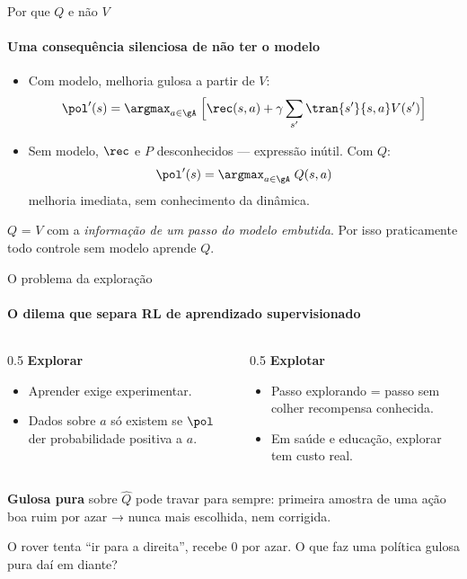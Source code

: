 \documentclass[aspectratio=169, 11pt]{beamer}
\newcommand{\Qhat}{\widehat{Q}}
\begin{document}
\begin{frame}{Por que $Q$ e não $V$}
  \framesubtitle{Uma consequência silenciosa de não ter o modelo}

  \begin{itemize}\setlength{\itemsep}{0.4ex}
    \item Com modelo, melhoria gulosa a partir de $V$:
      \[ \pol'(s) = \argmax_{a \in \gA}\; \Bigl[\rec(s,a) + \gamma \sum_{s'} \tran{s'}{s,a} V(s')\Bigr] \]
    \item Sem modelo, $\rec$ e $P$ desconhecidos — expressão inútil. Com $Q$:
      \[ \pol'(s) = \argmax_{a \in \gA}\; Q(s,a) \]
      melhoria imediata, sem conhecimento da dinâmica.
  \end{itemize}

  \begin{ideiabox}
    $Q$ = $V$ com a \emph{informação de um passo do modelo embutida}. Por
    isso praticamente todo controle sem modelo aprende $Q$.
  \end{ideiabox}

\end{frame}

\begin{frame}{O problema da exploração}
  \framesubtitle{O dilema que separa RL de aprendizado supervisionado}

  \begin{columns}[T]
    \begin{column}{0.5\textwidth}
      \textbf{Explorar}
      \begin{itemize}\setlength{\itemsep}{0.2ex}
        \item Aprender exige experimentar.
        \item Dados sobre $a$ só existem se $\pol$ der probabilidade
          positiva a $a$.
      \end{itemize}
    \end{column}
    \begin{column}{0.5\textwidth}
      \textbf{Explotar}
      \begin{itemize}\setlength{\itemsep}{0.2ex}
        \item Passo explorando = passo sem colher recompensa conhecida.
        \item Em saúde e educação, explorar tem custo real.
      \end{itemize}
    \end{column}
  \end{columns}

  \vspace{-0.2em}
  {\small \textbf{Gulosa pura} sobre $\Qhat$ pode travar para sempre:
  primeira amostra de uma ação boa ruim por azar → nunca mais escolhida,
  nem corrigida.}

  \vspace{-0.4em}
  \begin{quizbox}{}
    O rover tenta ``ir para a direita'', recebe $0$ por azar. O que faz
    uma política gulosa pura daí em diante?
  \end{quizbox}
\end{frame}
\end{document}
